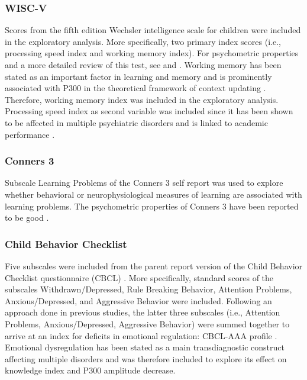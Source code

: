\subsubsection{WISC-V}
Scores from the fifth edition Wechsler intelligence scale for children \parencite[WISC-V][]{wechslerWechslerIntelligenceScale2014} were included in the exploratory analysis. More specifically, two primary index scores (i.e., processing speed index and working memory index). For psychometric properties and a more detailed review of this test, see \textcite{wechslerWechslerIntelligenceScale2014} and \textcite{meyerScoresSpaceMultidimensional2018}. Working memory has been stated as an important factor in learning and memory \parencite{cowanWorkingMemoryUnderpins2014} and is prominently associated with P300 in the theoretical framework of context updating \parencite{donchinP300ComponentManifestation1988,lenartowiczUpdatingContextWorking2010}. Therefore, working memory index was included in the exploratory analysis. Processing speed index as second variable was included since it has been shown to be affected in multiple psychiatric disorders and is linked to academic performance \parencite{mayesLearningAttentionWriting2007}.

\subsubsection{Conners 3}
Subscale Learning Problems of the Conners 3 self report \parencite{connersConners2008} was used to explore whether behavioral or neurophysiological measures of learning are associated with learning problems. The psychometric properties of Conners 3 have been reported to be good \parencite{connersConners2008}.

\subsubsection{Child Behavior Checklist}
Five subscales were included from the parent report version of the Child Behavior Checklist questionnaire (CBCL) \parencite{achenbachManualChildBehavior1991}. More specifically, standard scores of the subscales Withdrawn/Depressed, Rule Breaking Behavior, Attention Problems, Anxious/Depressed, and Aggressive Behavior were included. Following an approach done in previous studies, the latter three subscales (i.e., Attention Problems, Anxious/Depressed, Aggressive Behavior) were summed together to arrive at an index for deficits in emotional regulation: CBCL-AAA profile \parencite{biedermanSeverityAggressionAnxietydepression2012,donfrancescoDeficientEmotionalSelfRegulation2015}. Emotional dysregulation has been stated as a main transdiagnostic construct affecting multiple disorders \parencite{sloanEmotionRegulationTransdiagnostic2017} and was therefore included to explore its effect on knowledge index and P300 amplitude decrease.

